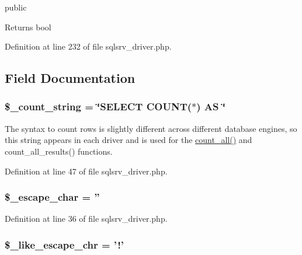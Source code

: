 public \begin{DoxyReturn}{Returns}
bool 
\end{DoxyReturn}


Definition at line 232 of file sqlsrv\-\_\-driver.\-php.



\subsection{Field Documentation}
\hypertarget{class_c_i___d_b__sqlsrv__driver_a06c80bac2ecbd0557827e96949c23097}{
\subsubsection[{\$\-\_\-count\-\_\-string}]{\setlength{\rightskip}{0pt plus 5cm}\$\-\_\-count\-\_\-string = \char`\"{}S\-E\-L\-E\-C\-T C\-O\-U\-N\-T($\ast$) A\-S \char`\"{}}}\label{class_c_i___d_b__sqlsrv__driver_a06c80bac2ecbd0557827e96949c23097}
The syntax to count rows is slightly different across different database engines, so this string appears in each driver and is used for the \hyperlink{class_c_i___d_b__sqlsrv__driver_a66111c61856499b091af32502978d4fc}{count\-\_\-all()} and count\-\_\-all\-\_\-results() functions. 

Definition at line 47 of file sqlsrv\-\_\-driver.\-php.

\hypertarget{class_c_i___d_b__sqlsrv__driver_aaec2fb0112850159063a8e47ad3aed6e}{
\subsubsection[{\$\-\_\-escape\-\_\-char}]{\setlength{\rightskip}{0pt plus 5cm}\$\-\_\-escape\-\_\-char = ''}}\label{class_c_i___d_b__sqlsrv__driver_aaec2fb0112850159063a8e47ad3aed6e}


Definition at line 36 of file sqlsrv\-\_\-driver.\-php.

\hypertarget{class_c_i___d_b__sqlsrv__driver_a668acfd923d0342389cd3a614628cf2a}{
\subsubsection[{\$\-\_\-like\-\_\-escape\-\_\-chr}]{\setlength{\rightskip}{0pt plus 5cm}\$\-\_\-like\-\_\-escape\-\_\-chr = '!'}}\label{class_c_i___d_b__sqlsrv__driver_a668acfd923d0342389cd3a614628cf2a}


